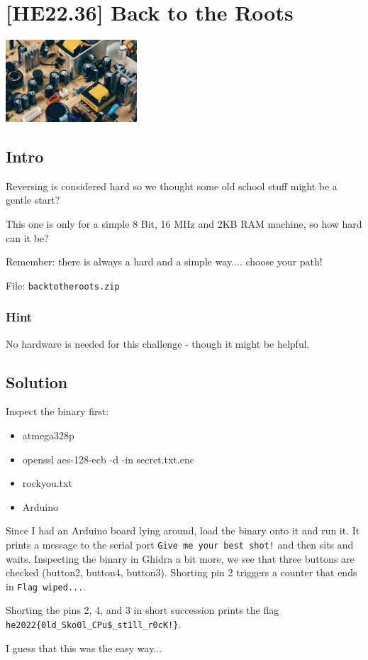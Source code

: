 
\hypertarget{he22.36}{%
\chapter{[HE22.36] Back to the Roots}\label{he22.36}}

\begin{marginfigure}
	\includegraphics[width=49mm]{level8/challenge36.jpg}
\end{marginfigure}
\section{Intro}
Reversing is considered hard so we thought some old school stuff might be a
gentle start?

This one is only for a simple 8 Bit, 16 MHz and 2KB RAM machine, so how hard
can it be?

Remember: there is always a hard and a simple way.... choose your path!

File: \verb+backtotheroots.zip+

\subsection{Hint}
No hardware is needed for this challenge - though it might be helpful.

\section{Solution}\label{hv22.36solution}

Inspect the binary first:
\begin{itemize}
\item atmega328p
\item openssl aes-128-ecb -d -in secret.txt.enc
\item rockyou.txt
\item Arduino
\end{itemize}

Since I had an Arduino board lying around, load the binary onto it and run it.
It prints a message to the serial port \texttt{Give me your best shot!} and then
sits and waits.  Inspecting the binary in Ghidra a bit more, we see that three
buttons are checked (button2, button4, button3).  Shorting pin 2 triggers a
counter that ends in \texttt{Flag wiped...}.  

Shorting the pins 2, 4, and 3 in short succession prints the flag
\verb+he2022{0ld_Sko0l_CPu$_st1ll_r0cK!}+.

I guess that this was the easy way...
